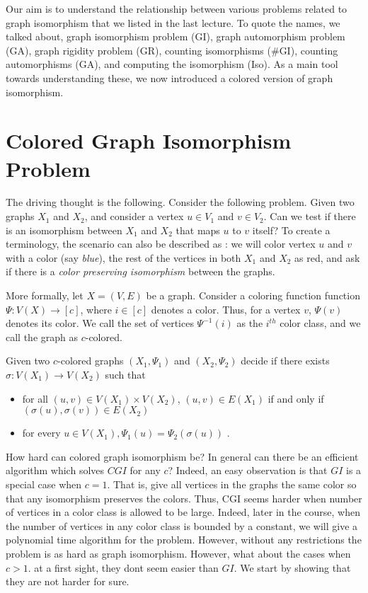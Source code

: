 
Our aim is to understand the relationship between various problems related to graph isomorphism that we listed in the last lecture. To quote the names, we talked about, graph isomorphism problem ({\sc GI}), graph automorphism problem ({\sc GA}), graph rigidity problem ({\sc GR}), counting isomorphisms ({\sc \#GI}), counting automorphisms ({\sc GA}), and computing the isomorphism ({\sc Iso}). As a main tool towards understanding these, we now introduced a colored version of graph isomorphism.

\section{Colored Graph Isomorphism Problem}

The driving thought is the following. Consider the following problem. Given two graphs $X_1$ and $X_2$, and consider a vertex $u \in V_1$ and $v \in V_2$. Can we test if there is an isomorphism between $X_1$ and $X_2$ that maps $u$ to $v$ itself? To create a terminology, the scenario can also be described as : we will color vertex $u$ and $v$ with a color (say {\em blue}), the rest of the vertices in both $X_1$ and $X_2$ as red, and ask if there is a {\em color preserving isomorphism} between the graphs.

More formally, let $X=(V,E)$ be a graph. Consider a coloring function function $\Psi : V(X) \rightarrow [c]$, where $i \in [c]$ denotes a color. Thus, for a vertex $v$, $\Psi(v)$ denotes its color. We call the set of vertices $\Psi^{-1}(i)$ as the $i^{th}$ color class, and we call the graph as $c$-colored.

\begin{problem}
Given two $c$-colored graphs $(X_1,\Psi_1)$ and $(X_2,\Psi_2)$ decide if there exists $\sigma : V(X_1) \rightarrow V(X_2)$ such that 
\begin{itemize}
\item for all $(u,v) \in V(X_1)\times V(X_2)$,  $(u,v) \in E(X_1)$ if and only if $(\sigma(u), \sigma(v)) \in E(X_2)$
\item for every $u \in V(X_1),\Psi_1(u) = \Psi_2(\sigma(u))$ .
\end{itemize}
\end{problem}

How hard can colored graph isomorphism be? In general can there be an efficient algorithm which solves $CGI$ for any $c$? Indeed, an easy observation is that $GI$ is a special case when $c=1$. That is, give all vertices in the graphs the same color so that any isomorphism preserves the colors. Thus, CGI seems harder when number of vertices in a color class is allowed to be large. Indeed, later in the course, when the number of vertices in any color class is bounded by a constant, we will give a polynomial time algorithm for the problem. However, without any restrictions the problem is as hard as graph isomorphism. However, what about the cases when $c>1$. at a first sight, they dont seem easier than $GI$. We start by showing that they are not harder for sure.

